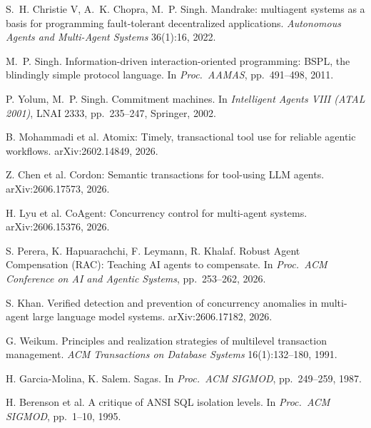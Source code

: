 \documentclass[11pt,a4paper]{article}
\begin{document}
\small
\begin{enumerate}[label={[\arabic*]},leftmargin=2em]
\item S.~H. Christie V, A.~K. Chopra, M.~P. Singh. Mandrake: multiagent
systems as a basis for programming fault-tolerant decentralized
applications. \emph{Autonomous Agents and Multi-Agent Systems}
36(1):16, 2022.
\item M.~P. Singh. Information-driven interaction-oriented programming:
BSPL, the blindingly simple protocol language. In \emph{Proc.\ AAMAS},
pp.~491--498, 2011.
\item P. Yolum, M.~P. Singh. Commitment machines. In \emph{Intelligent
Agents VIII (ATAL 2001)}, LNAI 2333, pp.~235--247, Springer, 2002.
\item B. Mohammadi et al. Atomix: Timely, transactional tool use for
reliable agentic workflows. arXiv:2602.14849, 2026.
\item Z. Chen et al. Cordon: Semantic transactions for tool-using LLM
agents. arXiv:2606.17573, 2026.
\item H. Lyu et al. CoAgent: Concurrency control for multi-agent systems.
arXiv:2606.15376, 2026.
\item S. Perera, K. Hapuarachchi, F. Leymann, R. Khalaf. Robust Agent
Compensation (RAC): Teaching AI agents to compensate. In \emph{Proc.\ ACM
Conference on AI and Agentic Systems}, pp.~253--262, 2026.
\item S. Khan. Verified detection and prevention of concurrency anomalies
in multi-agent large language model systems. arXiv:2606.17182, 2026.
\item G. Weikum. Principles and realization strategies of multilevel
transaction management. \emph{ACM Transactions on Database Systems}
16(1):132--180, 1991.
\item H. Garcia-Molina, K. Salem. Sagas. In \emph{Proc.\ ACM SIGMOD},
pp.~249--259, 1987.
\item H. Berenson et al. A critique of ANSI SQL isolation levels. In
\emph{Proc.\ ACM SIGMOD}, pp.~1--10, 1995.
\end{enumerate}
\end{document}
